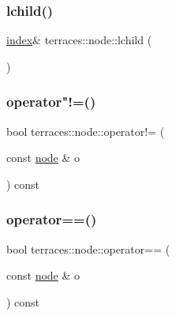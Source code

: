 \mbox{\label{structterraces_1_1node_a4df948704080a44771de4909dd94699a}} 
\subsubsection{\texorpdfstring{lchild()}{lchild()}\hspace{0.1cm}{\footnotesize\ttfamily [2/2]}}
{\footnotesize\ttfamily \hyperlink{namespaceterraces_adbc33ccb543d1634e96d0eb02e472c77}{index}\& terraces\+::node\+::lchild (\begin{DoxyParamCaption}{ }\end{DoxyParamCaption})\hspace{0.3cm}{\ttfamily [inline]}}

\mbox{\label{structterraces_1_1node_aebef4e5aff81c490f0fa4ee5ef146484}} 
\subsubsection{\texorpdfstring{operator"!=()}{operator!=()}}
{\footnotesize\ttfamily bool terraces\+::node\+::operator!= (\begin{DoxyParamCaption}\item[{const \hyperlink{structterraces_1_1node}{node} \&}]{o }\end{DoxyParamCaption}) const\hspace{0.3cm}{\ttfamily [inline]}}

\mbox{\label{structterraces_1_1node_ad0776c1f5b296a8cf52925b4e497814a}} 
\subsubsection{\texorpdfstring{operator==()}{operator==()}}
{\footnotesize\ttfamily bool terraces\+::node\+::operator== (\begin{DoxyParamCaption}\item[{const \hyperlink{structterraces_1_1node}{node} \&}]{o }\end{DoxyParamCaption}) const\hspace{0.3cm}{\ttfamily [inline]}}


